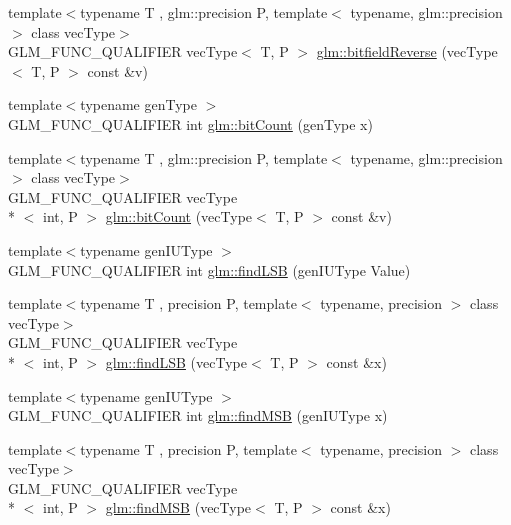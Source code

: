 \begin{DoxyCompactItemize}
\item 
{\footnotesize template$<$typename T , glm\-::precision P, template$<$ typename, glm\-::precision $>$ class vec\-Type$>$ }\\G\-L\-M\-\_\-\-F\-U\-N\-C\-\_\-\-Q\-U\-A\-L\-I\-F\-I\-E\-R vec\-Type$<$ T, P $>$ \hyperlink{group__core__func__integer_ga153e7e8d0c035f83cce50fc3e580930f}{glm\-::bitfield\-Reverse} (vec\-Type$<$ T, P $>$ const \&v)
\item 
{\footnotesize template$<$typename gen\-Type $>$ }\\G\-L\-M\-\_\-\-F\-U\-N\-C\-\_\-\-Q\-U\-A\-L\-I\-F\-I\-E\-R int \hyperlink{group__core__func__integer_ga44abfe3379e11cbd29425a843420d0d6}{glm\-::bit\-Count} (gen\-Type x)
\item 
{\footnotesize template$<$typename T , glm\-::precision P, template$<$ typename, glm\-::precision $>$ class vec\-Type$>$ }\\G\-L\-M\-\_\-\-F\-U\-N\-C\-\_\-\-Q\-U\-A\-L\-I\-F\-I\-E\-R vec\-Type\\*
$<$ int, P $>$ \hyperlink{group__core__func__integer_ga1f29640969a3c54564da06ac67a5392e}{glm\-::bit\-Count} (vec\-Type$<$ T, P $>$ const \&v)
\item 
{\footnotesize template$<$typename gen\-I\-U\-Type $>$ }\\G\-L\-M\-\_\-\-F\-U\-N\-C\-\_\-\-Q\-U\-A\-L\-I\-F\-I\-E\-R int \hyperlink{group__core__func__integer_gaf74c4d969fa34ab8acb9d390f5ca5274}{glm\-::find\-L\-S\-B} (gen\-I\-U\-Type Value)
\item 
{\footnotesize template$<$typename T , precision P, template$<$ typename, precision $>$ class vec\-Type$>$ }\\G\-L\-M\-\_\-\-F\-U\-N\-C\-\_\-\-Q\-U\-A\-L\-I\-F\-I\-E\-R vec\-Type\\*
$<$ int, P $>$ \hyperlink{group__core__func__integer_ga014a72009e68233c34c06a6dc2251b8c}{glm\-::find\-L\-S\-B} (vec\-Type$<$ T, P $>$ const \&x)
\item 
{\footnotesize template$<$typename gen\-I\-U\-Type $>$ }\\G\-L\-M\-\_\-\-F\-U\-N\-C\-\_\-\-Q\-U\-A\-L\-I\-F\-I\-E\-R int \hyperlink{group__core__func__integer_ga7e4a794d766861c70bc961630f8ef621}{glm\-::find\-M\-S\-B} (gen\-I\-U\-Type x)
\item 
{\footnotesize template$<$typename T , precision P, template$<$ typename, precision $>$ class vec\-Type$>$ }\\G\-L\-M\-\_\-\-F\-U\-N\-C\-\_\-\-Q\-U\-A\-L\-I\-F\-I\-E\-R vec\-Type\\*
$<$ int, P $>$ \hyperlink{group__core__func__integer_ga433104d77ec2ba58888aaefb77e9183f}{glm\-::find\-M\-S\-B} (vec\-Type$<$ T, P $>$ const \&x)
\end{DoxyCompactItemize}



